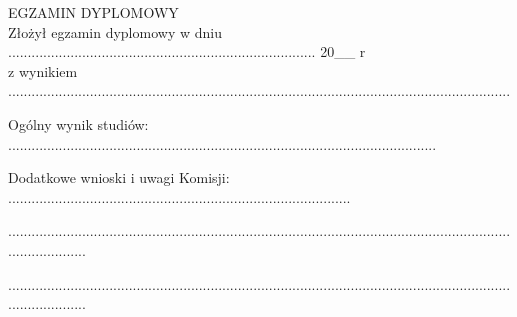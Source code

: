 \documentclass[../thesis.tex]{subfiles}
\begin{document}
\begin{flushleft}
\fontsize{12pt}{30pt}\selectfont
EGZAMIN DYPLOMOWY \\
Złożył egzamin dyplomowy w dniu ............................................................................... 20\_\_ r \\

z wynikiem .................................................................................................................................

Ogólny wynik studiów: ..............................................................................................................

Dodatkowe wnioski i uwagi Komisji: ........................................................................................

.....................................................................................................................................................

.....................................................................................................................................................

\end{flushleft}
\pagestyle{empty}
\cleardoublepage 
\end{document}
